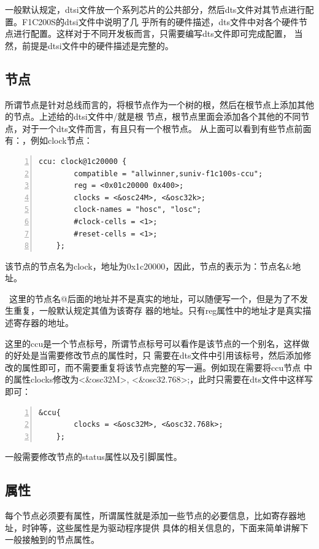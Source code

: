 一般默认规定，dtsi文件放一个系列芯片的公共部分，然后dts文件对其节点进行配置。F1C200S的dtsi文件中说明了几
乎所有的硬件描述，dts文件中对各个硬件节点进行配置。这样对于不同开发板而言，只需要编写dts文件即可完成配置，
当然，前提是dtsi文件中的硬件描述是完整的。
\subsection{节点}
所谓节点是针对总线而言的，将根节点作为一个树的根，然后在根节点上添加其他的节点。上述给的dtsi文件中/就是根
节点，根节点里面会添加各个其他的不同节点，对于一个dts文件而言，有且只有一个根节点。
从上面可以看到有些节点前面有：，例如clock节点：
\begin{lstlisting}[language={[ANSI]C},numbers=left,numberstyle=\tiny,frame=shadowbox,
	rulesepcolor=\color{red!20!green!20!blue!20},
	keywordstyle=\color{blue!70!black},
	commentstyle=\color{blue!90!},
	basicstyle=\ttfamily]
	ccu: clock@1c20000 {
		compatible = "allwinner,suniv-f1c100s-ccu";
		reg = <0x01c20000 0x400>;
		clocks = <&osc24M>, <&osc32k>;
		clock-names = "hosc", "losc";
		#clock-cells = <1>;
		#reset-cells = <1>;
	};
\end{lstlisting}
该节点的节点名为clock，地址为0x1c20000，因此，节点的表示为：节点名\&地址。
\begin{tcolorbox}[colback=red!5!white,colframe=red!75!black]
	\faWarning\
	这里的节点名@后面的地址并不是真实的地址，可以随便写一个，但是为了不发生重复，一般默认规定其值为该寄存
	器的地址。只有reg属性中的地址才是真实描述寄存器的地址。
\end{tcolorbox}
这里的ccu是一个节点标号，所谓节点标号可以看作是该节点的一个别名，这样做的好处是当需要修改节点的属性时，只
需要在dts文件中引用该标号，然后添加修改的属性即可，而不需要重复将该节点完整的写一遍。例如现在需要将ccu节点
中的属性clocks修改为<\&osc32M>, <\&osc32.768>;，此时只需要在dts文件中这样写即可：
\begin{lstlisting}[language={[ANSI]C},numbers=left,numberstyle=\tiny,frame=shadowbox,
	rulesepcolor=\color{red!20!green!20!blue!20},
	keywordstyle=\color{blue!70!black},
	commentstyle=\color{blue!90!},
	basicstyle=\ttfamily]
	&ccu{
		clocks = <&osc32M>, <&osc32.768k>;
	};
\end{lstlisting}
\begin{note}
	一般需要修改节点的status属性以及引脚属性。
\end{note}
\subsection{属性}
每个节点必须要有属性，所谓属性就是添加一些节点的必要信息，比如寄存器地址，时钟等，这些属性是为驱动程序提供
具体的相关信息的，下面来简单讲解下一般接触到的节点属性。


